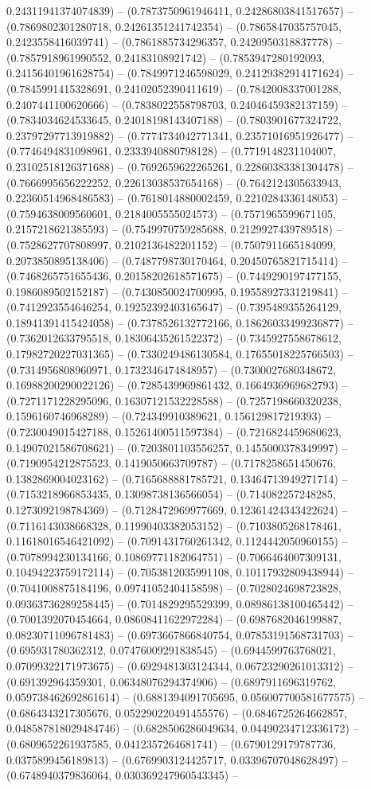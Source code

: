 0.24311941374074839) -- (0.7873750961946411, 0.24286803841517657) -- (0.7869802301280718, 0.24261351241742354) -- (0.7865847035757045, 0.2423558416039741) -- (0.7861885734296357, 0.2420950318837778) -- (0.7857918961990552, 0.24183108921742) -- (0.7853947280192093, 0.24156401961628754) -- (0.7849971246598029, 0.24129382914171624) -- (0.7845991415328691, 0.24102052390411619) -- (0.7842008337001288, 0.2407441100620666) -- (0.7838022558798703, 0.24046459382137159) -- (0.7834034624533645, 0.24018198143407188) -- (0.7803901677324722, 0.23797297713919882) -- (0.7774734042771341, 0.23571016951926477) -- (0.7746494831098961, 0.2333940880798128) -- (0.7719148231104007, 0.23102518126371688) -- (0.7692659622265261, 0.22860383381304478) -- (0.7666995656222252, 0.22613038537654168) -- (0.7642124305633943, 0.22360514968486583) -- (0.7618014880002459, 0.2210284336148053) -- (0.7594638009560601, 0.2184005555024573) -- (0.7571965599671105, 0.2157218621385593) -- (0.7549970759285688, 0.2129927439789518) -- (0.7528627707808997, 0.2102136482201152) -- (0.7507911665184099, 0.2073850895138406) -- (0.7487798730170464, 0.20450765821715414) -- (0.7468265751655436, 0.20158202618571675) -- (0.7449290197477155, 0.1986089502152187) -- (0.7430850024700995, 0.19558927331219841) -- (0.7412923554646254, 0.19252392403165647) -- (0.7395489355264129, 0.18941391415424058) -- (0.7378526132772166, 0.18626033499236877) -- (0.7362012633795518, 0.18306435261522372) -- (0.7345927558678612, 0.17982720227031365) -- (0.7330249486130584, 0.17655018225766503) -- (0.7314956808960971, 0.1732346474848957) -- (0.7300027680348672, 0.16988200290022126) -- (0.7285439969861432, 0.1664936969682793) -- (0.7271171228295096, 0.16307121532228588) -- (0.7257198660320238, 0.1596160746968289) -- (0.724349910389621, 0.156129817219393) -- (0.7230049015427188, 0.15261400511597384) -- (0.7216824459680623, 0.14907021586708621) -- (0.7203801103556257, 0.1455000378349997) -- (0.7190954212875523, 0.1419050663709787) -- (0.7178258651450676, 0.1382869004023162) -- (0.7165688881785721, 0.13464713949271714) -- (0.7153218966853435, 0.13098738136566054) -- (0.714082257248285, 0.1273092198784369) -- (0.7128472969977669, 0.12361424343422624) -- (0.7116143038668328, 0.11990403382053152) -- (0.7103805268178461, 0.11618016546421092) -- (0.7091431760261342, 0.1124442050960155) -- (0.7078994230134166, 0.10869771182064751) -- (0.7066464007309131, 0.10494223759172114) -- (0.7053812035991108, 0.10117932809438944) -- (0.7041008875184196, 0.09741052404158598) -- (0.7028024698723828, 0.09363736289258445) -- (0.7014829295529399, 0.08986138100465442) -- (0.7001392070454664, 0.08608411622972284) -- (0.6987682046199887, 0.08230711096781483) -- (0.6973667866840754, 0.07853191568731703) -- (0.695931780362312, 0.07476009291838545) -- (0.6944599763768021, 0.07099322171973675) -- (0.6929481303124344, 0.06723290261013312) -- (0.691392964359301, 0.06348076294374906) -- (0.6897911696319762, 0.059738462692861614) -- (0.6881394091705695, 0.056007700581677575) -- (0.6864343217305676, 0.052290220491455576) -- (0.6846725264662857, 0.048587818029484746) -- (0.6828506286049634, 0.04490234712336172) -- (0.6809652261937585, 0.0412357264681741) -- (0.6790129179787736, 0.0375899456189813) -- (0.6769903124425717, 0.03396707048628497) -- (0.6748940379836064, 0.030369247960543345) -- 
